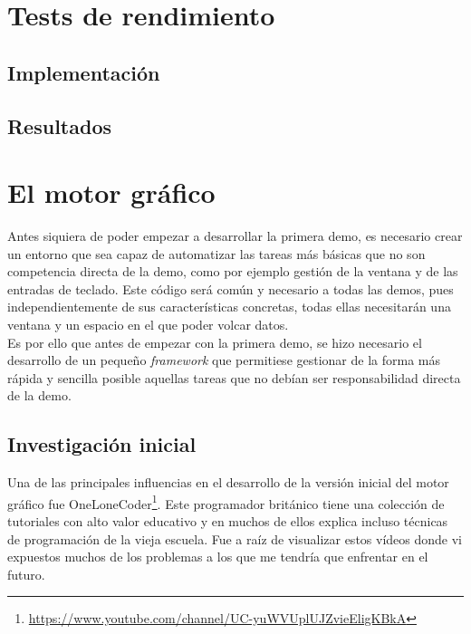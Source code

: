 
\chapter{Tests de rendimiento}

\section{Implementación}
\section{Resultados}

\chapter{El motor gráfico}

Antes siquiera de poder empezar a desarrollar la primera demo, es necesario crear un entorno que sea capaz de automatizar las tareas más básicas que no son competencia directa de la demo, como por ejemplo gestión de la ventana y de las entradas de teclado. Este código será común y necesario a todas las demos, pues independientemente de sus características concretas, todas ellas necesitarán una ventana y un espacio en el que poder volcar datos.\\

Es por ello que antes de empezar con la primera demo, se hizo necesario el desarrollo de un pequeño \emph{framework} que permitiese gestionar de la forma más rápida y sencilla posible aquellas tareas que no debían ser responsabilidad directa de la demo. 

\section{Investigación inicial}

Una de las principales influencias en el desarrollo de la versión inicial del motor gráfico fue OneLoneCoder\footnote{\url{https://www.youtube.com/channel/UC-yuWVUplUJZvieEligKBkA}}. Este programador británico tiene una colección de tutoriales con alto valor educativo y en muchos de ellos explica incluso técnicas de programación de la vieja escuela. Fue a raíz de visualizar estos vídeos donde vi expuestos muchos de los problemas a los que me tendría que enfrentar en el futuro.\\

